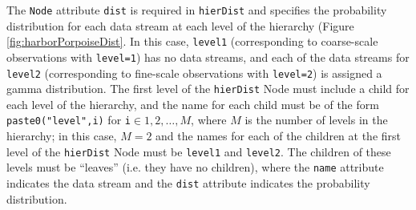 \documentclass[12pt]{article}\usepackage[]{graphicx}\usepackage[]{xcolor}
\begin{document}
\noindent The \verb|Node| attribute \verb|dist| is required in \verb|hierDist| and specifies the probability distribution for each data stream at each level of the hierarchy (Figure \ref{fig:harborPorpoiseDist}. In this case, \verb|level1| (corresponding to coarse-scale observations with \verb|level=1|) has no data streams, and each of the data streams for \verb|level2| (corresponding to fine-scale observations with \verb|level=2|) is assigned a gamma distribution. The first level of the \verb|hierDist| Node must include a child for each level of the hierarchy, and the name for each child must be of the form \verb|paste0("level",i)| for \verb|i|$\in{1,2,\ldots,M}$, where $M$ is the number of levels in the hierarchy; in this case, $M=2$ and the names for each of the children at the first level of the \verb|hierDist| Node must be \verb|level1| and \verb|level2|. The children of these levels must be ``leaves'' (i.e. they have no children), where the \verb|name| attribute indicates the data stream and the \verb|dist| attribute indicates the probability distribution.
\end{document}
